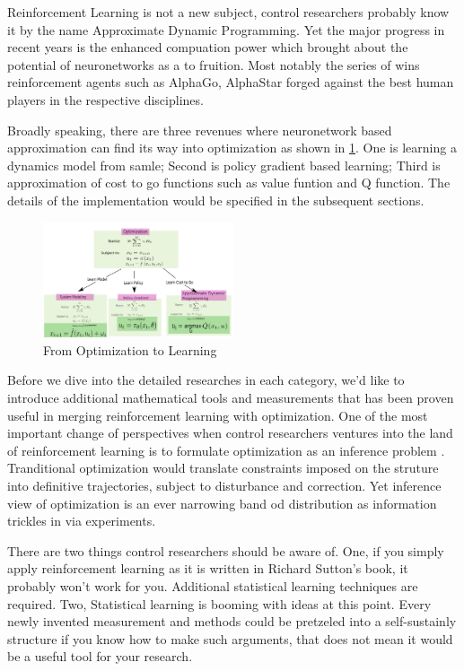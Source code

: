 \documentclass[journal]{IEEEtran}
\begin{document}
Reinforcement Learning is not a new subject, control researchers probably know it by the name Approximate Dynamic Programming. Yet the major progress in recent years is the enhanced compuation power which brought about the potential of neuronetworks as a to fruition. Most notably the series of wins reinforcement agents such as AlphaGo, AlphaStar forged against the best human players in the respective disciplines.

Broadly speaking, there are three revenues where neuronetwork based approximation can find its way into optimization as shown in \ref{fig:1}. One is learning a dynamics model from samle; Second is policy gradient based learning; Third is approximation of cost to go functions such as value funtion and Q function. The details of the implementation would be specified in the subsequent sections.

\begin{figure}[H]
    \centering
    \includegraphics[width=0.5\textwidth]{Control.png}
    \caption{From Optimization to Learning}
    \label{fig:1}
\end{figure}

Before we dive into the detailed researches in each category, we'd like to introduce additional mathematical tools and measurements that has been proven useful in merging reinforcement learning with optimization. One of the most important change of perspectives when control researchers ventures into the land of reinforcement learning is to formulate optimization as an inference problem \cite{Levine2018ReinforcementLA}. Tranditional optimization would translate constraints imposed on the struture into definitive trajectories, subject to disturbance and correction. Yet inference view of optimization is an ever narrowing band od distribution as information trickles in via experiments.

There are two things control researchers should be aware of. One, if you simply apply reinforcement learning as it is written in Richard Sutton's book, it probably won't work for you. Additional statistical learning techniques are required. Two, Statistical learning is booming with ideas at this point. Every newly invented measurement and methods could be pretzeled into a self-sustainly structure if you know how to make such arguments, that does not mean it would be a useful tool for your research.
\end{document}
